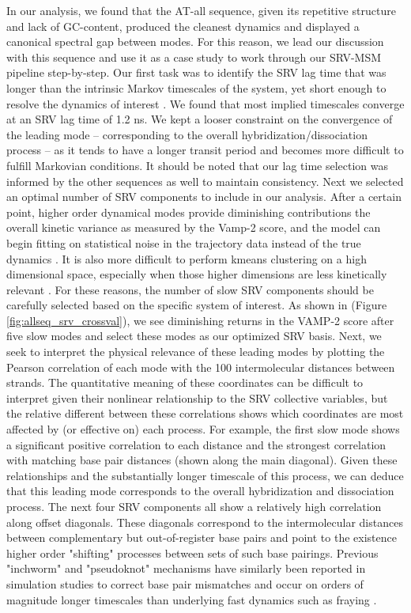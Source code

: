 \documentclass[journal=jpcbfk,manuscript=article]{achemso}
\begin{document}
In our analysis, we found that the AT-all sequence, given its repetitive structure and lack of GC-content, produced the cleanest dynamics and displayed a canonical spectral gap between modes. For this reason, we lead our discussion with this sequence and use it as a case study to work through our SRV-MSM pipeline step-by-step. Our first task was to identify the SRV lag time that was longer than the intrinsic Markov timescales of the system, yet short enough to resolve the dynamics of interest \citep{Phys2018MarkovValidation}. We found that most implied timescales converge at an SRV lag time of 1.2 ns. We kept a looser constraint on the convergence of the leading mode -- corresponding to the overall hybridization/dissociation process -- as it tends to have a longer transit period and becomes more difficult to fulfill Markovian conditions. It should be noted that our lag time selection was informed by the other sequences as well to maintain consistency. Next we selected an optimal number of SRV components to include in our analysis. After a certain point, higher order dynamical modes provide diminishing contributions the overall kinetic variance as measured by the Vamp-2 score, and the model can begin fitting on statistical noise in the trajectory data instead of the true dynamics \citep{McGibbon2015VariationalKinetics}. It is also more difficult to perform kmeans clustering on a high dimensional space, especially when those higher dimensions are less kinetically relevant \citep{Pande2010EverythingAsk}. For these reasons, the number of slow SRV components should be carefully selected based on the specific system of interest. As shown in (Figure \ref{fig:allseq_srv_crossval}), we see diminishing returns in the VAMP-2 score after five slow modes and select these modes as our optimized SRV basis. Next, we seek to interpret the physical relevance of these leading modes by plotting the Pearson correlation of each mode with the 100 intermolecular distances between strands. The quantitative meaning of these coordinates can be difficult to interpret given their nonlinear relationship to the SRV collective variables, but the relative different between these correlations shows which coordinates are most affected by (or effective on) each process. For example, the first slow mode shows a significant positive correlation to each distance and the strongest correlation with matching base pair distances (shown along the main diagonal). Given these relationships and the substantially longer timescale of this process, we can deduce that this leading mode corresponds to the overall hybridization and dissociation process. The next four SRV components all show a relatively high correlation along offset diagonals. These diagonals correspond to the intermolecular distances between complementary but out-of-register base pairs and point to the existence higher order "shifting" processes between sets of such base pairings. Previous "inchworm" and "pseudoknot" mechanisms have similarly been reported in simulation studies to correct base pair mismatches and occur on orders of magnitude longer timescales than underlying fast dynamics such as fraying \citep{Romano2013DNADependence, Markegard2015, Xiao2019, Maciejczyk2014DNAModel}.
\end{document}
